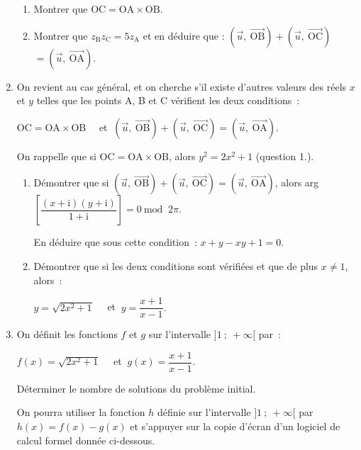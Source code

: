 \begin{enumerate}
\begin{enumerate}[label=\alph*.]
          \item Montrer que $\text{OC} = \text{OA} \times \text{OB}$.
          \item Montrer que $z_{\text{B}}z_{\text{C}} = 5 z_{\text{A}}$ et en déduire que :
          $\left(\overrightarrow{u},~\overrightarrow{\text{OB}}\right) + \left(\overrightarrow{u},~\overrightarrow{\text{OC}}\right)$\nosp$ = \left(\overrightarrow{u},~\overrightarrow{\text{OA}}\right)$.
     \end{enumerate}
     \item On revient au cas général, et on cherche s'il existe d'autres valeurs des réels $x$ et $y$ telles que les points A, B et C vérifient les deux conditions~:
     \par
     $\text{OC} = \text{OA} \times \text{OB} \quad$ et $\:  \left(\overrightarrow{u},~\overrightarrow{\text{OB}}\right) + \left(\overrightarrow{u},~\overrightarrow{\text{OC}}\right)$\nosp$ = \left(\overrightarrow{u},~\overrightarrow{\text{OA}}\right)$.
     \par
     On rappelle que si $\text{OC} = \text{OA} \times \text{OB}$, alors $y^2 = 2x^2 + 1$ (question 1.).
     \begin{enumerate}[label=\alph*.]
          \item Démontrer que si $\left(\overrightarrow{u},~\overrightarrow{\text{OB}}\right) + \left(\overrightarrow{u},~\overrightarrow{\text{OC}}\right)$\nosp$ = \left(\overrightarrow{u},~\overrightarrow{\text{OA}}\right)$, alors arg$\left[\dfrac{(x + \text{i})(y + \text{i})}{1 + \text{i}}\right] = 0$\nosp$ \:\text{mod }\: 2\pi$.
          \par
          En déduire que sous cette condition~: $x + y - xy + 1 = 0$.
          \item Démontrer que si les deux conditions sont vérifiées et que de plus $x \neq 1$, alors~:
          \begin{center}
               $y= \sqrt{2x^2 + 1}\quad $ et $\: y = \dfrac{x + 1}{x - 1}.$
          \end{center}
     \end{enumerate}
     \item On définit les fonctions $f$ et $g$ sur l'intervalle $]1~;~+ \infty[$ par~:
     \begin{center}
          $f(x) = \sqrt{2x^2 + 1}\quad$ et $\: g(x) = \dfrac{x + 1}{x - 1}.$
     \end{center}
     Déterminer le nombre de solutions du problème initial.
     \par
     On pourra utiliser la fonction $h$ définie sur l'intervalle $]1~;~+ \infty[$ par $h(x) = f(x) - g(x)$ et s'appuyer sur la copie d'écran d'un logiciel de calcul formel donnée ci-dessous.

\end{enumerate}
